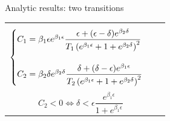\begin{frame}{Analytic results: two transitions}
	\begin{tabular}{l l}
		\begin{minipage}{0.62\textwidth}
			\begin{equation*}
				\begin{cases}
					C_1 = \beta_1\epsilon e^{\beta_1\epsilon} \dfrac{\epsilon  + (\epsilon -\delta) e^{\beta_2\delta}}{T_1 \left( e^{\beta_1\epsilon} + 1 + e^{\beta_2\delta} \right)^2}\\
					\vspace{0pt}\\
					C_2 = \beta_2\delta e^{\beta_2\delta} \dfrac{\delta  + (\delta - \epsilon) e^{\beta_1\epsilon} }{T_2 \left( e^{\beta_1\epsilon} + 1 + e^{\beta_2\delta} \right)^2}
				\end{cases}
			\end{equation*}
			\begin{equation*}
				C_2 < 0 \Leftrightarrow \delta < \epsilon\dfrac{ e^{\beta_1\epsilon}}{1 + e^{\beta_1\epsilon} }
			\end{equation*}
			

\end{minipage}
\end{tabular}
\end{frame}
